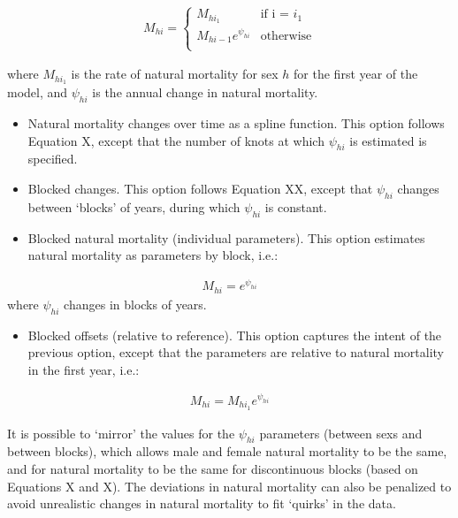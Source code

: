 \documentclass[]{article}
\providecommand{\tightlist}{%
  \setlength{\itemsep}{0pt}\setlength{\parskip}{0pt}}
\begin{document}
\begin{align}
 M_{hi} = 
  \begin{cases}
    M_{hi_{1}} & \text{if i = $i_{1}$ } \\[2ex]
    M_{hi-1}e^{\psi_{hi}} & \text{otherwise} \\
    \end{cases}
    \end{align}

where \(M_{hi_{1}}\) is the rate of natural mortality for sex \(h\) for
the first year of the model, and \(\psi_{hi}\) is the annual change in
natural mortality.

\begin{itemize}
\tightlist
\item
  Natural mortality changes over time as a spline function. This option
  follows Equation X, except that the number of knots at which
  \(\psi_{hi}\) is estimated is specified.\\
\item
  Blocked changes. This option follows Equation XX, except that
  \(\psi_{hi}\) changes between `blocks' of years, during which
  \(\psi_{hi}\) is constant.\\
\item
  Blocked natural mortality (individual parameters). This option
  estimates natural mortality as parameters by block, i.e.:
\end{itemize}

\begin{align}
          M_{hi} = e^{\psi_{hi}}
\end{align} where \(\psi_{hi}\) changes in blocks of years.

\begin{itemize}
\tightlist
\item
  Blocked offsets (relative to reference). This option captures the
  intent of the previous option, except that the parameters are relative
  to natural mortality in the first year, i.e.:
\end{itemize}

\begin{align}
          M_{hi} = M_{hi_{1}}e^{\psi_{hi}}
\end{align}

It is possible to `mirror' the values for the \(\psi_{hi}\) parameters
(between sexs and between blocks), which allows male and female natural
mortality to be the same, and for natural mortality to be the same for
discontinuous blocks (based on Equations X and X). The deviations in
natural mortality can also be penalized to avoid unrealistic changes in
natural mortality to fit `quirks' in the data.
\end{document}
